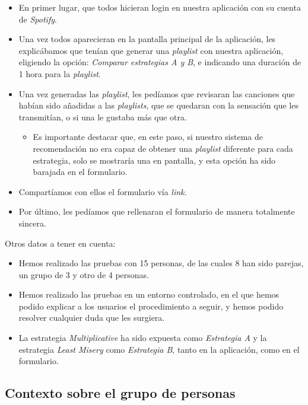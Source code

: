 \begin{itemize}
    \item En primer lugar, que todos hicieran login en nuestra aplicación con su cuenta de \textit{Spotify}.
    \item Una vez todos aparecieran en la pantalla principal de la aplicación, les explicábamos que tenían que generar una \textit{playlist} con nuestra aplicación, eligiendo
    la opción: \textit{Comparar estrategias A y B}, e indicando una duración de 1 hora para la \textit{playlist}.
    \item Una vez generadas las \textit{playlist}, les pedíamos que revisaran las canciones que habían sido añadidas a las \textit{playlists}, que se quedaran con la 
    sensación que les transmitían, o si una le gustaba más que otra.
    \begin{itemize}
        \item Es importante destacar que, en este paso, si nuestro sistema de recomendación no era capaz de obtener una \textit{playlist}
        diferente para cada estrategia, solo se mostraría una en pantalla, y esta opción ha sido barajada en el formulario.
    \end{itemize}
    \item Compartíamos con ellos el formulario vía \textit{link}.
    \item Por último, les pedíamos que rellenaran el formulario de manera totalmente sincera.
\end{itemize}

Otros datos a tener en cuenta:

\begin{itemize}
    \item Hemos realizado las pruebas con 15 personas, de las cuales 8 han sido parejas, un grupo de 3 y otro de 4 personas.
    \item Hemos realizado las pruebas en un entorno controlado, en el que hemos podido explicar a los usuarios el procedimiento a seguir, y hemos podido resolver
    cualquier duda que les surgiera.
    \item La estrategia \textit{Multiplicative} ha sido expuesta como \textit{Estrategia A} y la estrategia \textit{Least Misery} como \textit{Estrategia B}, tanto en la 
    aplicación, como en el formulario.
\end{itemize}

\subsection{Contexto sobre el grupo de personas\label{SEC:CONTEXTOS}}

